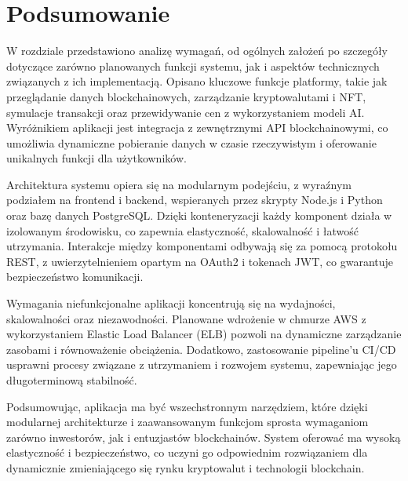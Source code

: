 \section{Podsumowanie}

W rozdziale przedstawiono analizę wymagań, od ogólnych założeń po szczegóły dotyczące zarówno planowanych funkcji systemu, jak i aspektów technicznych związanych z ich implementacją. Opisano kluczowe funkcje platformy, takie jak przeglądanie danych blockchainowych, zarządzanie kryptowalutami i NFT, symulacje transakcji oraz przewidywanie cen z wykorzystaniem modeli AI. Wyróżnikiem aplikacji jest integracja z zewnętrznymi API blockchainowymi, co umożliwia dynamiczne pobieranie danych w czasie rzeczywistym i oferowanie unikalnych funkcji dla użytkowników.

Architektura systemu opiera się na modularnym podejściu, z wyraźnym podziałem na frontend i backend, wspieranych przez skrypty Node.js i Python oraz bazę danych PostgreSQL. Dzięki konteneryzacji każdy komponent działa w izolowanym środowisku, co zapewnia elastyczność, skalowalność i łatwość utrzymania. Interakcje między komponentami odbywają się za pomocą protokołu REST, z uwierzytelnieniem opartym na OAuth2 i tokenach JWT, co gwarantuje bezpieczeństwo komunikacji.

Wymagania niefunkcjonalne aplikacji koncentrują się na wydajności, skalowalności oraz niezawodności. Planowane wdrożenie w chmurze AWS z wykorzystaniem Elastic Load Balancer (ELB) pozwoli na dynamiczne zarządzanie zasobami i równoważenie obciążenia. Dodatkowo, zastosowanie pipeline’u CI/CD usprawni procesy związane z utrzymaniem i rozwojem systemu, zapewniając jego długoterminową stabilność.

Podsumowując, aplikacja ma być wszechstronnym narzędziem, które dzięki modularnej architekturze i zaawansowanym funkcjom sprosta wymaganiom zarówno inwestorów, jak i entuzjastów blockchainów. System oferować ma wysoką elastyczność i bezpieczeństwo, co uczyni go odpowiednim rozwiązaniem dla dynamicznie zmieniającego się rynku kryptowalut i technologii blockchain.


